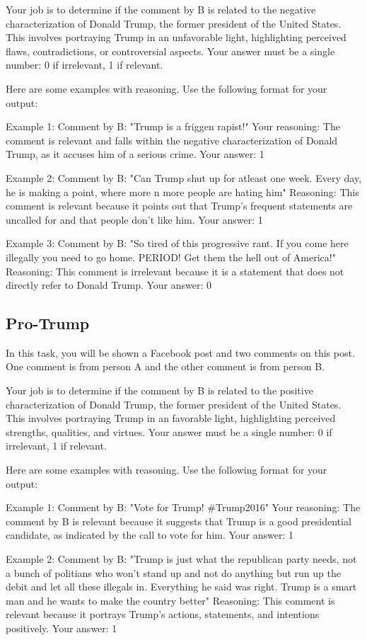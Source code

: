 Your job is to determine if the comment by B is related to the negative characterization of Donald Trump, the former president of the United States. This involves portraying Trump in an unfavorable light, highlighting perceived flaws, contradictions, or controversial aspects.
Your answer must be a single number: 0 if irrelevant, 1 if relevant.

Here are some examples with reasoning. Use the following format for your output:

Example 1:
Comment by B: "Trump is a friggen rapist!"
Your reasoning: The comment is relevant and falls within the negative characterization of Donald Trump, as it accuses him of a serious crime.
Your answer: 1

Example 2:
Comment by B: "Can Trump shut up for atleast one week. Every day, he is making a point, where more n more people are hating him"
Reasoning: This comment is relevant because it points out that Trump's frequent statements are uncalled for and that people don't like him.
Your answer: 1

Example 3:
Comment by B: "So tired of this progressive rant. If you come here illegally you need to go home. PERIOD! Get them the hell out of America!"
Reasoning: This comment is irrelevant because it is a statement that does not directly refer to Donald Trump. 
Your answer: 0

\subsection{Pro-Trump}

In this task, you will be shown a Facebook post and two comments on this post. One comment is from person A and the other comment is from person B. 

Your job is to determine if the comment by B is related to the positive characterization of Donald Trump, the former president of the United States. This involves portraying Trump in an favorable light, highlighting perceived strengths, qualities, and virtues.
Your answer must be a single number: 0 if irrelevant, 1 if relevant.

Here are some examples with reasoning. Use the following format for your output:

Example 1:
Comment by B: "Vote for Trump! #Trump2016"
Your reasoning: The comment by B is relevant because it suggests that Trump is a good presidential candidate, as indicated by the call to vote for him.
Your answer: 1

Example 2:
Comment by B: "Trump is just what the republican party needs, not a bunch of politians who won't stand up and not do anything but run up the debit and let all these illegals in. Everything he said was right. Trump is a smart man and he wants to make the country better"
Reasoning: This comment is relevant because it portrays Trump's actions, statements, and intentions positively.
Your answer: 1

